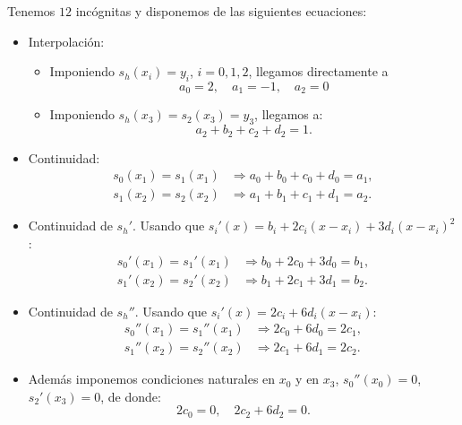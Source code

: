  Tenemos $12$ incógnitas y disponemos de las siguientes ecuaciones:
 \begin{itemize}
 \item Interpolación:
   \begin{itemize}
   \item Imponiendo $s_h(x_i)=y_i$, $i=0,1,2$, llegamos directamente
     a
     \begin{equation*}
       a_0=2, \quad a_1=-1, \quad a_2=0
     \end{equation*}
   \item Imponiendo $s_h(x_3)=s_2(x_3)=y_3$, llegamos a:
     \begin{equation*}
       a_2+b_2+c_2+d_2=1.
     \end{equation*}
   \end{itemize}
 \item Continuidad:
   \begin{align*}
     s_0(x_1)=s_1(x_1) &\Rightarrow a_0+b_0+c_0+d_0 = a_1,
     \\
     s_1(x_2)=s_2(x_2) &\Rightarrow a_1+b_1+c_1+d_1 = a_2.
   \end{align*}
 \item Continuidad de $s_h'$. Usando que
   $s_i'(x)=b_i+2c_i(x-x_i)+3d_i(x-x_i)^2$:
   \begin{align*}
     s_0'(x_1)=s_1'(x_1) &\Rightarrow b_0+2c_0+3d_0 = b_1,
     \\
     s_1'(x_2)=s_2'(x_2) &\Rightarrow b_1+2c_1+3d_1 = b_2.
   \end{align*}
 \item Continuidad de $s_h''$. Usando que
   $s_i'(x)=2c_i+6d_i(x-x_i)$:
   \begin{align*}
     s_0''(x_1)=s_1''(x_1) &\Rightarrow 2c_0+6d_0 = 2c_1,
     \\
     s_1''(x_2)=s_2''(x_2) &\Rightarrow 2c_1+6d_1 = 2c_2.
   \end{align*}
 \item Además imponemos condiciones naturales en $x_0$ y en $x_3$,
   $s_0''(x_0)=0$, $s_2'(x_3)=0$, de donde:
   \begin{equation*}
     2c_0 = 0, \quad 2c_2 + 6 d_2 =0.
   \end{equation*}
 \end{itemize}

